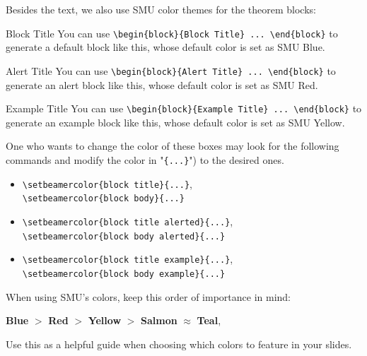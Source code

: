 \documentclass[12pt, aspectratio=169]{beamer}
\begin{document}
\begin{frame}[fragile]{\insertsubsection}
Besides the text, we also use SMU color themes for the theorem blocks:
\begin{block}{Block Title}
You can use \verb|\begin{block}{Block Title} ... \end{block}| to generate a default block like this, whose default color is set as SMU Blue.
\end{block}
\begin{alertblock}{Alert Title}
You can use \verb|\begin{block}{Alert Title} ... \end{block}| to generate an alert block like this, whose default color is set as SMU Red.
\end{alertblock}
\begin{exampleblock}{Example Title}
You can use \verb|\begin{block}{Example Title} ... \end{block}| to generate an example block like this, whose default color is set as SMU Yellow.
\end{exampleblock}
\end{frame}

\begin{frame}[fragile]{\insertsubsection}
One who wants to change the color of these boxes may look for the following commands and modify the color in "\verb|{...}|") to the desired ones.
\begin{itemize}
    \item \verb|\setbeamercolor{block title}{...}|,\\ \verb|\setbeamercolor{block body}{...}|
    \item \verb|\setbeamercolor{block title alerted}{...}|,\\ \verb|\setbeamercolor{block body alerted}{...}|
    \item \verb|\setbeamercolor{block title example}{...}|,\\ \verb|\setbeamercolor{block body example}{...}|
\end{itemize}
When using SMU's colors, keep this order of importance in mind:
{\par\centering
\textcolor{SMUBlue}{\bf Blue} $>$ \textcolor{SMURed}{\bf Red} $>$ \textcolor{SMUYellow}{\bf Yellow} $>$ \textcolor{SMUSalmon}{\bf Salmon} $\approx$ \textcolor{SMUTeal}{\bf Teal},
\par}
Use this as a helpful guide when choosing which colors to feature in your slides.
\end{frame}
\end{document}
